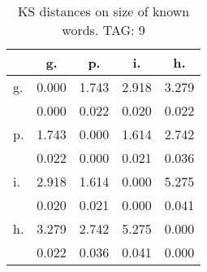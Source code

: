 \begin{table}[h!]
\begin{center}
\begin{tabular}{| l | c | c | c | c |}\hline
 & g. & p. & i. & h. \\\hline
g. & 0.000  & 1.743  & 2.918  & 3.279 \\\hline
 & 0.000  & 0.022  & 0.020  & 0.022 \\\hline
p. & 1.743  & 0.000  & 1.614  & 2.742 \\\hline
 & 0.022  & 0.000  & 0.021  & 0.036 \\\hline
i. & 2.918  & 1.614  & 0.000  & 5.275 \\\hline
 & 0.020  & 0.021  & 0.000  & 0.041 \\\hline
h. & 3.279  & 2.742  & 5.275  & 0.000 \\\hline
 & 0.022  & 0.036  & 0.041  & 0.000 \\\hline
\end{tabular}
\caption{KS distances on size of known words. TAG: 9}
\end{center}
\end{table}